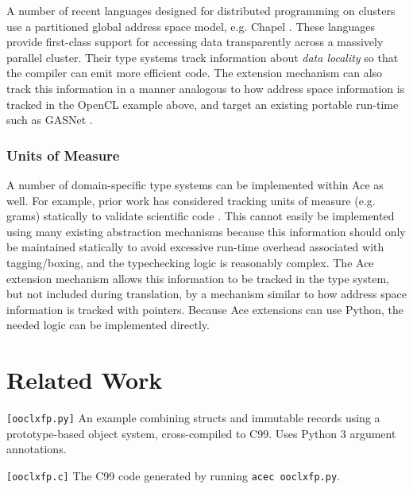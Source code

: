 \documentclass[9pt,preprint]{sigplanconf}
\begin{document}
A number of recent languages designed for distributed programming on clusters use a partitioned global address space model, e.g. Chapel \cite{chapel}. These languages provide first-class support for accessing data transparently across a massively parallel cluster. Their type systems track information about \emph{data locality} so that the compiler can emit more efficient code. The extension mechanism can also track this information in a manner analogous to how address space information is tracked in the OpenCL example above, and target an existing portable run-time such as GASNet \cite{bonachea2002gasnet}.

\subsubsection{Units of Measure}
A number of domain-specific type systems can be implemented within Ace as well. For example, prior work has considered tracking units of measure (e.g. grams) statically to validate scientific code \cite{conf/cefp/Kennedy09}. This cannot easily be implemented using many existing abstraction mechanisms because this information should only be maintained statically to avoid excessive run-time overhead associated with tagging/boxing, and the typechecking logic is reasonably complex. The Ace extension mechanism allows this information to be tracked in the type system, but not included during translation, by a mechanism similar to how address space information is tracked with pointers. Because Ace extensions can use Python, the needed logic can be implemented directly.

\section{Related Work}\label{related}
\begin{codelisting}[t]

\caption{\texttt{[ooclxfp.py]} An example combining structs and immutable records using a prototype-based object system, cross-compiled to C99. Uses Python 3 argument annotations.}
\label{ooclxfppy}
\end{codelisting}
\begin{codelisting}[t]

\caption{\texttt{[ooclxfp.c]} The C99 code generated by running \texttt{acec ooclxfp.py}.}
\label{ooclxfpc}
\end{codelisting}
\end{document}
